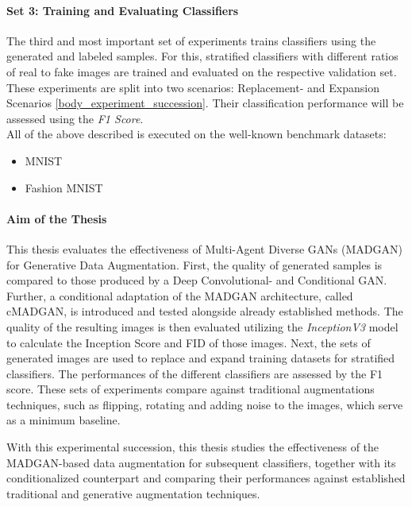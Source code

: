 \paragraph{Set 3: Training and Evaluating Classifiers}  \label{thesis_goal_3}
The third and most important set of experiments trains classifiers using the generated and labeled samples. For this, stratified classifiers with different ratios of real to fake images are trained and evaluated on the respective validation set. These experiments are split into two scenarios: Replacement- and Expansion Scenarios \ref{body_experiment_succession}. Their classification performance will be assessed using the \textit{F1 Score}.  \\

\noindent All of the above described is executed on the well-known benchmark datasets:
\begin{itemize}\label{used_datasets}
    \setlength{\itemsep}{-5pt}
    \item MNIST \cite{lecun2010mnist}
    \item Fashion MNIST \cite{xiao2017fashionmnist}
\end{itemize}


\paragraph{Aim of the Thesis}\label{aim_of_the_thesis}
This thesis evaluates the effectiveness of Multi-Agent Diverse GANs (MADGAN) for Generative Data Augmentation. First, the quality of generated samples is compared to those produced by a Deep Convolutional- and Conditional GAN. Further, a conditional adaptation of the MADGAN architecture, called cMADGAN, is introduced and tested alongside already established methods. The quality of the resulting images is then evaluated utilizing the \textit{InceptionV3} model to calculate the Inception Score and FID of those images. Next, the sets of generated images are used to replace and expand training datasets for stratified classifiers. The performances of the different classifiers are assessed by the F1 score. These sets of experiments compare against traditional augmentations techniques, such as flipping, rotating and adding noise to the images, which serve as a minimum baseline. 

\noindent
With this experimental succession, this thesis studies the effectiveness of the MADGAN-based data augmentation for subsequent classifiers, together with its conditionalized counterpart and comparing their performances against established traditional and generative augmentation techniques. 


\newpage
